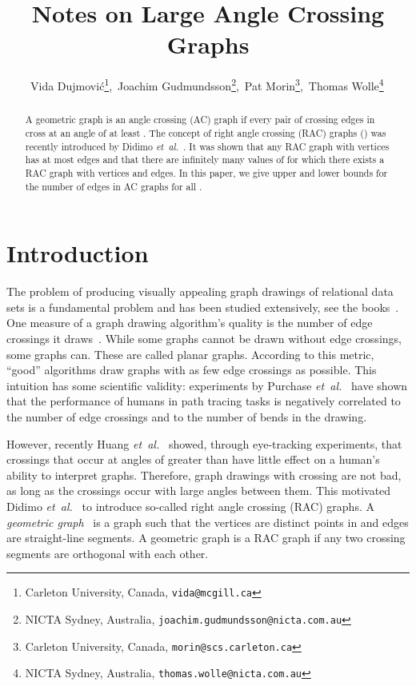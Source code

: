 \documentclass{patmorin}
\newcommand{\etal}{\emph{et~al.}}
\begin{document}
\title{Notes on Large Angle Crossing Graphs}


\author{Vida Dujmovi\'c\thanks{{Carleton University, Canada}, \texttt{vida@mcgill.ca}},\,
Joachim Gudmundsson\thanks{{NICTA Sydney, Australia}, \texttt{joachim.gudmundsson@nicta.com.au}},\,
Pat Morin\thanks{{Carleton University, Canada}, \texttt{morin@scs.carleton.ca}},\,
Thomas Wolle\thanks{{NICTA Sydney, Australia}, \texttt{thomas.wolle@nicta.com.au}}\,
}

\maketitle



\begin{abstract}
A geometric graph  is an  angle crossing (AC) graph if
every pair of crossing edges in  cross at an angle of at least
.  The concept of right angle crossing (RAC) graphs ()
was recently introduced by Didimo \etal\ \cite{del-dgrac-09}. It was
shown that any RAC graph with  vertices has at most  edges
and that there are infinitely many values of  for which there exists a RAC
graph with  vertices and  edges.  In this paper, we give upper
and lower bounds for the number of edges in AC graphs for all
.
\end{abstract}

\section{Introduction}

The problem of producing visually appealing graph drawings of relational data sets is a fundamental problem and has been studied extensively, see the books~\cite{bett-gd-99,jm-gds-03,kw-dgmm-01,nr-pgd-04}.
One measure of a graph drawing algorithm's quality is the number of edge crossings it draws~\cite{ew-ecdbg-94,jm-2lscm-97,kw-dgmm-01,n-ibosm-05}.
While some graphs cannot be drawn without edge crossings, some graphs can. These are called planar graphs.
According to this metric, ``good'' algorithms draw graphs with as few edge crossings as possible.
This intuition has some scientific validity:
experiments by Purchase \etal~\cite{p-eiv-00,pca-eeabg-02,wpcm-cmga-02}
have shown that the performance of humans in path tracing tasks is negatively correlated to the number of edge crossings and to the number of bends in the drawing.

However, recently Huang \etal\ \cite{h-uetig-07,h-etseg-08,hhe-eca-08} showed, through eye-tracking experiments, that crossings that occur at angles of greater than  have little effect on a human's ability to interpret graphs.  Therefore, graph drawings with crossing are not bad, as long as the crossings occur with large angles between them. This motivated Didimo \etal\ \cite{del-dgrac-09} to introduce so-called right angle crossing (RAC) graphs.  A \emph{geometric graph}~\cite{ae-degg-89} is a graph  such that the vertices are distinct points in  and edges are straight-line segments. A geometric graph  is a RAC graph if any two crossing segments are orthogonal with each other.
\end{document}
